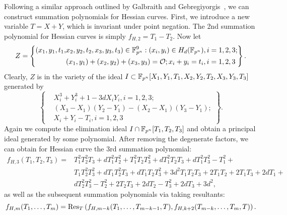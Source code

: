 Following a similar approach outlined by Galbraith and
Gebregiyorgis~\cite{DBLP:conf/indocrypt/GalbraithG14}, we can
construct summation polynomials for Hessian curves.
%
First, we introduce a new variable $T=X+Y$, which is invariant under
point negation.
%
The 2nd summation polynomial for Hessian curves is simply
$f_{H,2} = T_1 - T_2$.
%
Now let
\[ Z=\left\{\begin{aligned}
      (x_1,y_1,t_1,&x_2,y_2,t_2,x_3,y_3,t_3)\in\mathbb F_{p^n}^9:(x_i,y_i)\in H_d(\mathbb F_{p^n}),i=1,2,3; \\
      & (x_1,y_1)+(x_2,y_2)+(x_3,y_3)=\mathcal O; x_i+y_i=t_i,i=1,2,3
    \end{aligned} \right\}. \]
%
Clearly, $Z$ is in the variety of the ideal
$I\subset\mathbb F_{p^n}[X_1,Y_1,T_1,X_2,Y_2,T_2,X_3,Y_3,T_3]$ generated by
\[ \left\{\begin{aligned}
      & X_i^3 + Y_i^3 + 1 - 3dX_iY_i,i=1,2,3; \\
      &  (X_3 - X_1)(Y_2 - Y_1) - (X_2 - X_1)(Y_3 - Y_1); \\
      & X_i + Y_i - T_i,i=1,2,3
    \end{aligned}\right\}. \]
%
Again we compute the elimination ideal $I\cap\mathbb F_{p^n}[T_1,T_2,T_3]$ and
obtain a principal ideal generated by some polynomial.
%
After removing the degenerate factors, we can obtain for Hessian curve
the 3rd summation polynomial:
\begin{align*}
  f_{H,3}(T_1,T_2,T_3) = & T_1^2T_2^2T_3 + dT_1^2T_2^2 + T_1^2T_2T_3^2
                           + dT_1^2T_2T_3 + dT_1^2T_3^2 - T_1^2 + \\
                         & T_1T_2^2T_3^2 + dT_1T_2^2T_3 + dT_1T_2T_3^2
                           + 3d^2T_1T_2T_3 + 2T_1T_2 + 2T_1T_3 + 2dT_1
                           + \\
                         & dT_2^2T_3^2 - T_2^2 + 2T_2T_3 + 2dT_2 - T_3^2 + 2dT_3 + 3d^2,
\end{align*}
%
as well as the subsequent summation polynomials via taking resultants:
\[ f_{H,m}(T_1,\ldots,T_m) =
  \operatorname{Res}_T\left(f_{H,m-k}(T_1,\ldots,T_{m-k-1},T),f_{H,k+2}(T_{m-k},\ldots,T_m,T)\right). \]



